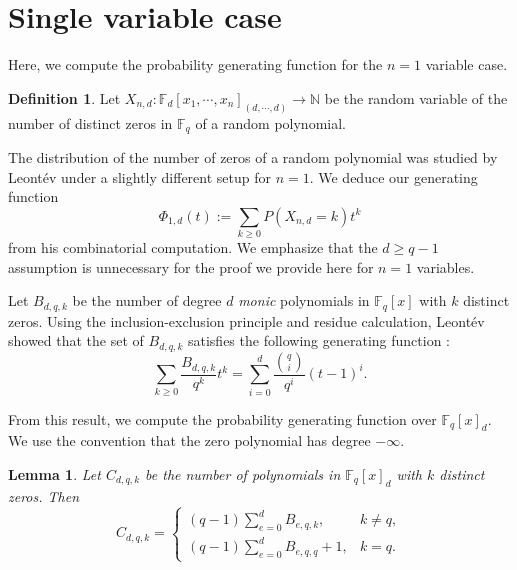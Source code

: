 \documentclass[12pt]{amsart}
\newtheorem{lemma}[theorem]{Lemma}
\theoremstyle{definition}
\newtheorem{definition}[theorem]{Definition}
\newcommand{\FF}{\mathbb{F} }
\newcommand{\NN}{\mathbb{N} }
\begin{document}

\section{Single variable case}\label{sec:singlevar}

Here, we compute the probability generating function for the  $n = 1$ variable case. 

\begin{definition}\label{def:Xnd}
Let $X_{n,d} : \FF_d[x_1, \cdots, x_n]_{(d,\cdots, d)} \to \NN$ be the random variable of the number of distinct zeros in $\FF_q$ of a random polynomial. 
\end{definition}

The distribution of the number of zeros of a random polynomial was studied by Leont\'ev under a slightly different setup \cite{Leo06} for $n = 1$. We deduce our generating function 
\begin{equation}\label{eqn:probgenfunctionn=1}
    \Phi_{1,d}(t) := \sum_{k \ge 0}P(X_{n,d} = k)t^k
\end{equation}
from his combinatorial computation. We emphasize that the $d \ge q-1$ assumption is unnecessary for the proof we provide here for $n = 1$ variables.

Let $B_{d,q,k}$ be the number of degree $d$ \emph{monic} polynomials in $\FF_q[x]$ with $k$ distinct zeros. Using the inclusion-exclusion principle and residue calculation, Leont\'ev showed that the set of $B_{d,q,k}$ satisfies the following generating function \cite[Lemma 4]{Leo06}:
\begin{equation}\label{eqn:Leontevgenerating}
    \sum_{k \ge 0}\frac{B_{d,q,k}}{q^k}t^k = \sum_{i=0}^d\frac{{q \choose i}}{q^i}(t-1)^i.
\end{equation}

From this result, we compute the probability generating function over $\FF_q[x]_d$. We use the convention that the zero polynomial has degree $-\infty$.

\begin{lemma}\label{lem:cdqk}
Let $C_{d,q,k}$ be the number of polynomials in $\FF_q[x]_d$ with $k$ distinct zeros. Then
\[
    C_{d,q,k} = \begin{cases}
        (q-1)\sum_{e=0}^{d}B_{e,q,k}, &k \ne q,\\
        (q-1)\sum_{e=0}^{d}B_{e,q,q} + 1, &k = q.
    \end{cases}
\]
\end{lemma}
\end{document}
